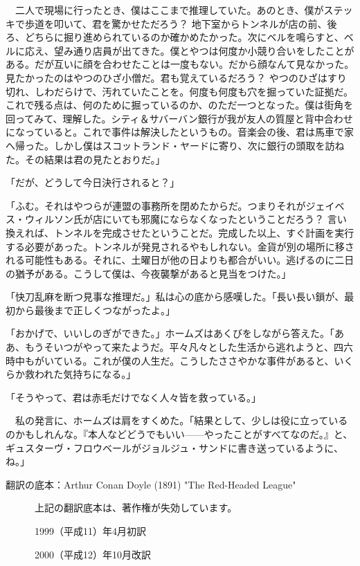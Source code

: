 \documentclass[tate,paper=b6j,jafontsize=9pt]{jlreq}
\begin{document}
　二人で現場に行ったとき、僕はここまで推理していた。あのとき、僕がステッキで歩道を叩いて、君を驚かせただろう？ 地下室からトンネルが店の前、後ろ、どちらに掘り進められているのか確かめたかった。次にベルを鳴らすと、ベルに応え、望み通り店員が出てきた。僕とやつは何度か小競り合いをしたことがある。だが互いに顔を合わせたことは一度もない。だから顔なんて見なかった。見たかったのはやつのひざ小僧だ。君も覚えているだろう？ やつのひざはすり切れ、しわだらけで、汚れていたことを。何度も何度も穴を掘っていた証拠だ。これで残る点は、何のために掘っているのか、のただ一つとなった。僕は街角を回ってみて、理解した。シティ＆サバーバン銀行が我が友人の質屋と背中合わせになっていると。これで事件は解決したというもの。音楽会の後、君は馬車で家へ帰った。しかし僕はスコットランド・ヤードに寄り、次に銀行の頭取を訪ねた。その結果は君の見たとおりだ。」

「だが、どうして今日決行されると？」

「ふむ。それはやつらが連盟の事務所を閉めたからだ。つまりそれがジェイベス・ウィルソン氏が店にいても邪魔にならなくなったということだろう？ 言い換えれば、トンネルを完成させたということだ。完成した以上、すぐ計画を実行する必要があった。トンネルが発見されるやもしれない。金貨が別の場所に移される可能性もある。それに、土曜日が他の日よりも都合がいい。逃げるのに二日の猶予がある。こうして僕は、今夜襲撃があると見当をつけた。」

「快刀乱麻を断つ見事な推理だ。」私は心の底から感嘆した。「長い長い鎖が、最初から最後まで正しくつながったよ。」

「おかげで、いいしのぎができた。」ホームズはあくびをしながら答えた。「ああ、もうそいつがやって来たようだ。平々凡々とした生活から逃れようと、四六時中もがいている。これが僕の人生だ。こうしたささやかな事件があると、いくらか救われた気持ちになる。」

「そうやって、君は赤毛だけでなく人々皆を救っている。」

　私の発言に、ホームズは肩をすくめた。「結果として、少しは役に立っているのかもしれんな。『本人などどうでもいい------やったことがすべてなのだ。』と、ギュスターヴ・フロウベールがジョルジュ・サンドに書き送っているように、ね。」




\newpage
翻訳の底本：Arthur Conan Doyle (1891) "The Red-Headed League"

　　　上記の翻訳底本は、著作権が失効しています。

　　　1999（平成11）年4月初訳

　　　2000（平成12）年10月改訳
\end{document}
